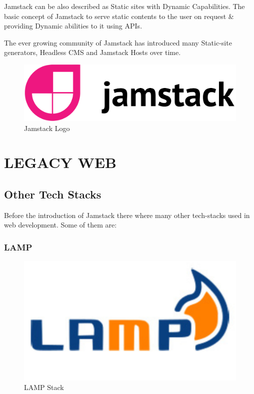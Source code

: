 \documentclass[12pt,a4paper,oneside]{report}
\begin{document}
\par
Jamstack can be also described as Static sites with Dynamic Capabilities. The basic concept of Jamstack to serve static contents to the user on request \& providing Dynamic abilities to it using APIs.
\par
The ever growing community of Jamstack has introduced many Static-site generators, Headless CMS and Jamstack Hosts over time. 

\begin{figure}
    \centering
    \includegraphics[scale=.2]{images/Jamstack-logo.png}
    \caption{Jamstack Logo\cite{official}}
\end{figure}

\grap

\chapter{LEGACY WEB}

\section{Other Tech Stacks}
\pre 
Before the introduction of Jamstack there where many other tech-stacks used in web development. Some of them are: 

\subsection{LAMP}
\begin{figure}[H]
    \centering
    \includegraphics[scale=.15]{images/lamp.jpg}
    \caption{LAMP Stack\cite{lamp}}
\end{figure}
\end{document}

